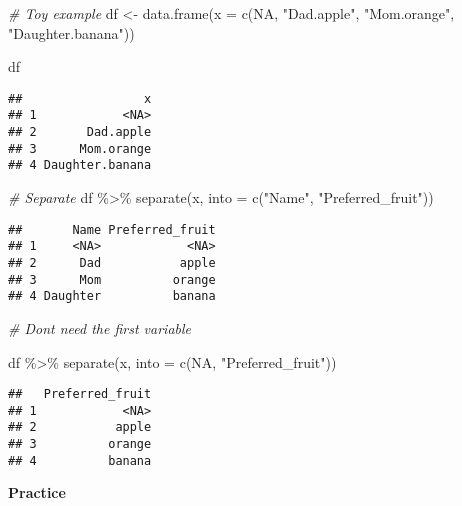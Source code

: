 \documentclass[
]{book}
\newenvironment{Shaded}{\begin{snugshade}}{\end{snugshade}}
\newcommand{\AttributeTok}[1]{\textcolor[rgb]{0.77,0.63,0.00}{#1}}
\newcommand{\CommentTok}[1]{\textcolor[rgb]{0.56,0.35,0.01}{\textit{#1}}}
\newcommand{\ConstantTok}[1]{\textcolor[rgb]{0.00,0.00,0.00}{#1}}
\newcommand{\FunctionTok}[1]{\textcolor[rgb]{0.00,0.00,0.00}{#1}}
\newcommand{\NormalTok}[1]{#1}
\newcommand{\OtherTok}[1]{\textcolor[rgb]{0.56,0.35,0.01}{#1}}
\newcommand{\SpecialCharTok}[1]{\textcolor[rgb]{0.00,0.00,0.00}{#1}}
\newcommand{\StringTok}[1]{\textcolor[rgb]{0.31,0.60,0.02}{#1}}
\begin{document}
\begin{Shaded}
\begin{Highlighting}[]
\CommentTok{\# Toy example}
\NormalTok{df }\OtherTok{\textless{}{-}} \FunctionTok{data.frame}\NormalTok{(}\AttributeTok{x =} \FunctionTok{c}\NormalTok{(}\ConstantTok{NA}\NormalTok{, }\StringTok{"Dad.apple"}\NormalTok{, }\StringTok{"Mom.orange"}\NormalTok{, }\StringTok{"Daughter.banana"}\NormalTok{))}

\NormalTok{df}
\end{Highlighting}
\end{Shaded}

\begin{verbatim}
##                 x
## 1            <NA>
## 2       Dad.apple
## 3      Mom.orange
## 4 Daughter.banana
\end{verbatim}

\begin{Shaded}
\begin{Highlighting}[]
\CommentTok{\# Separate}
\NormalTok{df }\SpecialCharTok{\%\textgreater{}\%}
  \FunctionTok{separate}\NormalTok{(x, }\AttributeTok{into =} \FunctionTok{c}\NormalTok{(}\StringTok{"Name"}\NormalTok{, }\StringTok{"Preferred\_fruit"}\NormalTok{))}
\end{Highlighting}
\end{Shaded}

\begin{verbatim}
##       Name Preferred_fruit
## 1     <NA>            <NA>
## 2      Dad           apple
## 3      Mom          orange
## 4 Daughter          banana
\end{verbatim}

\begin{Shaded}
\begin{Highlighting}[]
\CommentTok{\# Don\textquotesingle{}t need the first variable}

\NormalTok{df }\SpecialCharTok{\%\textgreater{}\%}
  \FunctionTok{separate}\NormalTok{(x, }\AttributeTok{into =} \FunctionTok{c}\NormalTok{(}\ConstantTok{NA}\NormalTok{, }\StringTok{"Preferred\_fruit"}\NormalTok{))}
\end{Highlighting}
\end{Shaded}

\begin{verbatim}
##   Preferred_fruit
## 1            <NA>
## 2           apple
## 3          orange
## 4          banana
\end{verbatim}

\textbf{Practice}
\end{document}
